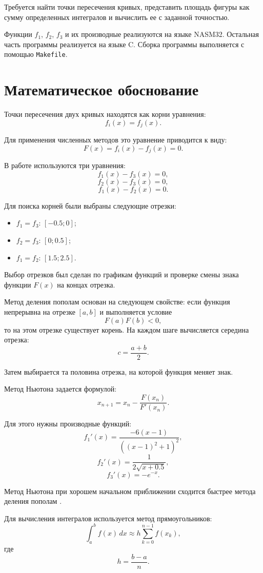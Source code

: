 \documentclass[a4paper,12pt]{article}
\begin{document}
Требуется найти точки пересечения кривых, представить площадь фигуры как сумму определенных интегралов и вычислить ее с заданной точностью.

Функции $f_1$, $f_2$, $f_3$ и их производные реализуются на языке NASM32. Остальная часть программы реализуется на языке C. Сборка программы выполняется с помощью \texttt{Makefile}.

\newpage
\section{Математическое обоснование}
Точки пересечения двух кривых находятся как корни уравнения:
\[
f_i(x)=f_j(x).
\]

Для применения численных методов это уравнение приводится к виду:
\[
F(x)=f_i(x)-f_j(x)=0.
\]

В работе используются три уравнения:
\[
f_1(x)-f_3(x)=0,
\]
\[
f_2(x)-f_3(x)=0,
\]
\[
f_1(x)-f_2(x)=0.
\]

Для поиска корней были выбраны следующие отрезки:
\begin{itemize}
    \item $f_1=f_3$: $[-0.5;0]$;
    \item $f_2=f_3$: $[0;0.5]$;
    \item $f_1=f_2$: $[1.5;2.5]$.
\end{itemize}

Выбор отрезков был сделан по графикам функций и проверке смены знака функции $F(x)$ на концах отрезка.

Метод деления пополам основан на следующем свойстве: если функция непрерывна на отрезке $[a,b]$ и выполняется условие
\[
F(a)F(b)<0,
\]
то на этом отрезке существует корень. На каждом шаге вычисляется середина отрезка:
\[
c=\frac{a+b}{2}.
\]

Затем выбирается та половина отрезка, на которой функция меняет знак.

Метод Ньютона задается формулой:
\[
x_{n+1}=x_n-\frac{F(x_n)}{F'(x_n)}.
\]

Для этого нужны производные функций:
\[
f_1'(x)=\frac{-6(x-1)}{((x-1)^2+1)^2},
\]
\[
f_2'(x)=\frac{1}{2\sqrt{x+0.5}},
\]
\[
f_3'(x)=-e^{-x}.
\]

Метод Ньютона при хорошем начальном приближении сходится быстрее метода деления пополам \cite{math1}.

Для вычисления интегралов используется метод прямоугольников:
\[
\int_a^b f(x)\,dx \approx h\sum_{k=0}^{n-1} f(x_k),
\]
где
\[
h=\frac{b-a}{n}.
\]
\end{document}
